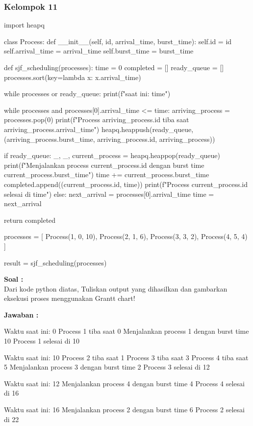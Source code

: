 \documentclass[12pt]{article}
\begin{document}
\subsubsection{Kelompok 11}
\begin{python}
    import heapq

    class Process:
        def __init__(self, id, arrival_time, burst_time):
            self.id = id
            self.arrival_time = arrival_time
            self.burst_time = burst_time
    
    def sjf_scheduling(processes):
        time = 0
        completed = []
        ready_queue = []
        processes.sort(key=lambda x: x.arrival_time)
    
        while processes or ready_queue:
            print(f"\Waktu saat ini: {time}")
            
            while processes and processes[0].arrival_time <= time:
                arriving_process = processes.pop(0)
                print(f"Process {arriving_process.id} tiba saat {arriving_process.arrival_time}")
                heapq.heappush(ready_queue, (arriving_process.burst_time, arriving_process.id, arriving_process))
            
            if ready_queue:
                _, _, current_process = heapq.heappop(ready_queue)
                print(f"Menjalankan process {current_process.id} dengan burst time {current_process.burst_time}")
                time += current_process.burst_time
                completed.append((current_process.id, time))
                print(f"Process {current_process.id} selesai di {time}")
            else:
                next_arrival = processes[0].arrival_time
                time = next_arrival
    
        return completed
    
    processes = [
        Process(1, 0, 10),
        Process(2, 1, 6),
        Process(3, 3, 2),
        Process(4, 5, 4)
    ]
    
    result = sjf_scheduling(processes)
\end{python}

\textbf{Soal :}
\\
Dari kode python diatas, Tuliskan output yang dihasilkan dan gambarkan eksekusi proses menggunakan Grantt chart!

\textbf{Jawaban :}
\begin{python}
Waktu saat ini: 0
Process 1 tiba saat 0
Menjalankan process 1 dengan burst time 10
Process 1 selesai di 10

Waktu saat ini: 10
Process 2 tiba saat 1
Process 3 tiba saat 3
Process 4 tiba saat 5
Menjalankan process 3 dengan burst time 2
Process 3 selesai di 12

Waktu saat ini: 12
Menjalankan process 4 dengan burst time 4
Process 4 selesai di 16

Waktu saat ini: 16
Menjalankan process 2 dengan burst time 6
Process 2 selesai di 22

\end{python}
\end{document}
